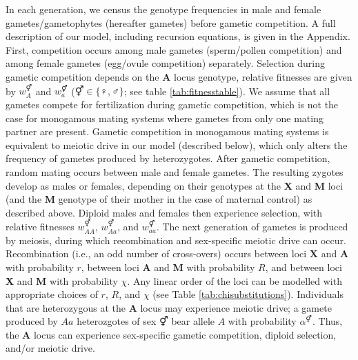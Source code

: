 \documentclass[12pt]{article}
\begin{document}
In each generation, we census the genotype frequencies in male and female gametes/gametophytes (hereafter gametes) before gametic competition. 
A full description of our model, including recursion equations, is given in the Appendix. 
First, competition occurs among male gametes (sperm/pollen competition) and among female gametes (egg/ovule competition) separately. 
Selection during gametic competition depends on the \textbf{A} locus genotype, relative fitnesses are given by $w_A^\Hermaphrodite$ and $w_a^\Hermaphrodite$ ($\Hermaphrodite \in \{\female,\male\}$; see table \ref{tab:fitnesstable}). %
We assume that all gametes compete for fertilization during gametic competition, which is not the case for monogamous mating systems where gametes from only one mating partner are present. 
Gametic competition in monogamous mating systems is equivalent to meiotic drive in our model (described below), which only alters the frequency of gametes produced by heterozygotes. 
After gametic competition, random mating occurs between male and female gametes.
The resulting zygotes develop as males or females, depending on their genotypes at the \textbf{X} and \textbf{M} loci (and the \textbf{M} genotype of their mother in the case of maternal control) as described above.
Diploid males and females then experience selection, with relative fitnesses $w_{AA}^{\Hermaphrodite}$, $w_{Aa}^{\Hermaphrodite}$, and $w_{aa}^{\Hermaphrodite}$. %
The next generation of gametes is produced by meiosis, during which recombination and sex-specific meiotic drive can occur. 
Recombination (i.e., an odd number of cross-overs) occurs between loci \textbf{X} and \textbf{A} with probability $r$, between loci \textbf{A} and \textbf{M} with probability $R$, and between loci \textbf{X} and \textbf{M} with probability $\chi$.
Any linear order of the loci can be modelled with appropriate choices of $r$, $R$, and $\chi$ (see Table \ref{tab:chisubstitutions}). 
Individuals that are heterozygous at the \textbf{A} locus may experience meiotic drive; a gamete produced by $Aa$ heterozgotes of sex $\Hermaphrodite$ bear allele $A$ with probability $\alpha^\Hermaphrodite$. 
Thus, the \textbf{A} locus can experience sex-specific gametic competition, diploid selection, and/or meiotic drive. 
\end{document}
